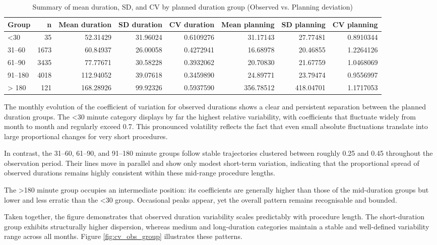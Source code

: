 \documentclass[
]{article}
\begin{document}
\begin{table}

\caption{\label{tab:cv group}Summary of mean duration, SD, and CV by planned duration group (Observed vs. Planning deviation) \label{tab:cv_group}}
\centering
\begin{tabular}[t]{lrrrrrrr}
\toprule
Group & n & Mean duration & SD duration & CV duration & Mean planning & SD planning & CV planning\\
\midrule
<30 & 35 & 52.31429 & 31.96024 & 0.6109276 & 31.17143 & 27.77481 & 0.8910344\\
31–60 & 1673 & 60.84937 & 26.00058 & 0.4272941 & 16.68978 & 20.46855 & 1.2264126\\
61–90 & 3435 & 77.77671 & 30.58228 & 0.3932062 & 20.70830 & 21.67759 & 1.0468069\\
91–180 & 4018 & 112.94052 & 39.07618 & 0.3459890 & 24.89771 & 23.79474 & 0.9556997\\
> 180 & 121 & 168.28926 & 99.92326 & 0.5937590 & 356.78512 & 418.04701 & 1.1717053\\
\bottomrule
\end{tabular}
\end{table}

The monthly evolution of the coefficient of variation for observed
durations shows a clear and persistent separation between the planned
duration groups. The \textless30 minute category displays by far the
highest relative variability, with coefficients that fluctuate widely
from month to month and regularly exceed 0.7. This pronounced volatility
reflects the fact that even small absolute fluctuations translate into
large proportional changes for very short procedures.

In contrast, the 31--60, 61--90, and 91--180 minute groups follow stable
trajectories clustered between roughly 0.25 and 0.45 throughout the
observation period. Their lines move in parallel and show only modest
short-term variation, indicating that the proportional spread of
observed durations remains highly consistent within these mid-range
procedure lengths.

The \textgreater180 minute group occupies an intermediate position: its
coefficients are generally higher than those of the mid-duration groups
but lower and less erratic than the \textless30 group. Occasional peaks
appear, yet the overall pattern remains recognisable and bounded.

Taken together, the figure demonstrates that observed duration
variability scales predictably with procedure length. The short-duration
group exhibits structurally higher dispersion, whereas medium and
long-duration categories maintain a stable and well-defined variability
range across all months. Figure \ref{fig:cv_obs_group} illustrates these
patterns.
\end{document}
